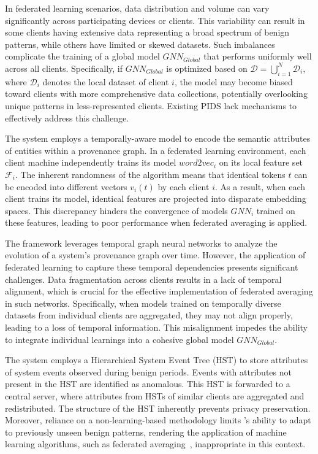  In federated learning scenarios, data distribution and volume can vary significantly across participating devices or clients. This variability can result in some clients having extensive data representing a broad spectrum of benign patterns, while others have limited or skewed datasets. Such imbalances complicate the training of a global model \( GNN_{Global} \) that performs uniformly well across all clients. Specifically, if \( GNN_{Global} \) is optimized based on $\mathcal{D} = \bigcup_{i=1}^{N} \mathcal{D}_i$, where $\mathcal{D}_i$ denotes the local dataset of client $i$, the model may become biased toward clients with more comprehensive data collections, potentially overlooking unique patterns in less-represented clients. Existing PIDS lack mechanisms to effectively address this challenge.

 The \flash system employs a temporally-aware \wordvec model to encode the semantic attributes of entities within a provenance graph. In a federated learning environment, each client machine independently trains its \wordvec model \( word2vec_{i} \) on its local feature set $\mathcal{F}_i$. The inherent randomness of the \wordvec algorithm means that identical tokens $t$ can be encoded into different vectors $v_i(t)$ by each client $i$. As a result, when each client trains its \wordvec model, identical features are projected into disparate embedding spaces. This discrepancy hinders the convergence of \gnn models \( GNN_{i} \) trained on these features, leading to poor performance when federated averaging is applied.

 The \kairos framework leverages temporal graph neural networks to analyze the evolution of a system's provenance graph over time. However, the application of federated learning to capture these temporal dependencies presents significant challenges. Data fragmentation across clients results in a lack of temporal alignment, which is crucial for the effective implementation of federated averaging in such networks. Specifically, when models trained on temporally diverse datasets from individual clients are aggregated, they may not align properly, leading to a loss of temporal information. This misalignment impedes the ability to integrate individual learnings into a cohesive global model \( GNN_{Global} \).

 The \disdet system employs a Hierarchical System Event Tree (HST) to store attributes of system events observed during benign periods. Events with attributes not present in the HST are identified as anomalous. This HST is forwarded to a central server, where attributes from HSTs of similar clients are aggregated and redistributed. The structure of the HST inherently prevents privacy preservation. Moreover, reliance on a non-learning-based methodology limits \disdet's ability to adapt to previously unseen benign patterns, rendering the application of machine learning algorithms, such as federated averaging~\cite{mcmahan2017communication}, inappropriate in this context.


